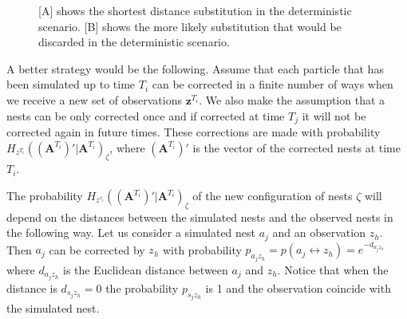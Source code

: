 \documentclass[11pt,a4paper]{article}
\renewcommand{\vec}[1]{\mathbf{#1}}
\begin{document}
\begin{figure}
\centering
\caption{[A] shows the shortest distance substitution in the deterministic scenario. [B] shows the more likely substitution that would be discarded in the deterministic scenario.}
\label{fig:1}
\end{figure}

A better strategy would be the following. Assume that each particle that has been simulated up to time $T_i$ can be corrected in a finite number of ways when we receive a new set of observations $\vec{z}^{T_i}$. We also make the assumption that a nests can be only corrected once and if corrected at time $T_j$ it will not be corrected again in future times. These corrections are made with probability $H_{z^{T_i}}((\vec{A}^{T_i})' | \vec{A}^{T_i})_{\zeta}$, where $(\vec{A}^{T_i})'$ is the vector of the corrected nests at time $T_i$.

The probability $H_{z^{\tau_i}}((\vec{A}^{T_i})' | \vec{A}^{T_i})_{\zeta}$ of the new configuration of nests $\zeta$ will depend on the distances between the simulated nests and the observed nests in the following way. Let us consider a simulated nest $a_j$ and an observation $z_h$. Then $a_j$ can be corrected by $z_h$ with probability $p_{a_j z_h} = p(a_j \leftrightarrow z_h) = e^{-d_{a_j z_h}}$ where $d_{a_j z_h}$ is the Euclidean distance between $a_j$ and $z_h$. Notice that when the distance is $d_{s_j z_h} = 0$ the probability $p_{s_j z_h}$ is 1 and the observation coincide with the simulated nest. 
\end{document}
